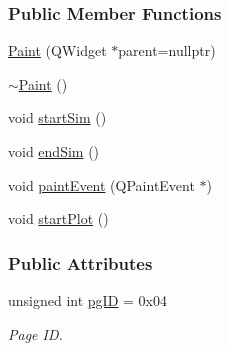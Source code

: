 \subsubsection*{Public Member Functions}
\begin{DoxyCompactItemize}
\item 
\mbox{\hyperlink{classPaint_a3be358e4052f20b7342f17a37fc32c4e}{Paint}} (Q\+Widget $\ast$parent=nullptr)
\item 
\mbox{\hyperlink{classPaint_ad9e9b7084b28e84887c70d0e4540ddb8}{$\sim$\+Paint}} ()
\item 
void \mbox{\hyperlink{classPaint_a1f01fcd27e595cc9aacd1ef94e3e1454}{start\+Sim}} ()
\item 
void \mbox{\hyperlink{classPaint_a0624eaeb1d076ab01278b27026aba249}{end\+Sim}} ()
\item 
void \mbox{\hyperlink{classPaint_a93538df552b492f35b5349c9c546707f}{paint\+Event}} (Q\+Paint\+Event $\ast$)
\item 
void \mbox{\hyperlink{classPaint_ab8c4d8cbf3999cd2b80b299587ec9e83}{start\+Plot}} ()
\end{DoxyCompactItemize}
\subsubsection*{Public Attributes}
\begin{DoxyCompactItemize}
\item 
unsigned int \mbox{\hyperlink{classPaint_af6314388e667b01d9cd88e1d875d0449}{pg\+ID}} = 0x04
\begin{DoxyCompactList}\small\item\em Page ID. \end{DoxyCompactList}\end{DoxyCompactItemize}
